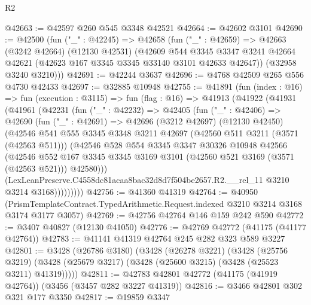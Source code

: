 \begin{lexlean}{R2}
\begin{coremodule}
@42663 := @42597 @260 @545 @3348 @42521
@42664 := @42602 @3101
@42690 := @42500
    (fun ("_" : @42245) =>
    @42658
      (fun ("_" : @42659) =>
      @42663
        (@3242 @42664)
        (@12130 @42531)
        (@42609
          @544
          @3345
          @3347
          @3241
          @42664
          @42621
          (@42623 @167 @3345 @3345 @33140 @3101 @42633 @42647))
        (@32958 @3240 @3210)))
@42691 := @42244 @3637
@42696 := @4768 @42509 @265 @556 @4730 @42433
@42697 := @32885 @10948
@42755 := @41891
    (fun (index : @16) =>
    fun (execution : @3115) =>
    fun (flag : @16) =>
    @41913
      (@41922
        (@41931
          (@41961
            (@42231
              (fun ("_" : @42232) =>
              @42405
                (fun ("_" : @42406) =>
                @42690
                  (fun ("_" : @42691) =>
                  @42696
                    (@3212 @42697)
                    (@12130 @42450)
                    (@42546
                      @541
                      @555
                      @3345
                      @3348
                      @3211
                      @42697
                      (@42560 @511 @3211 (@3571 (@42563 @511)))
                      (@42546
                        @528
                        @554
                        @3345
                        @3347
                        @30326
                        @10948
                        @42566
                        (@42546
                          @552
                          @167
                          @3345
                          @3345
                          @3169
                          @3101
                          (@42560 @521 @3169 (@3571 (@42563 @521)))
                          @42580)))
                    (LexLeanPreserve.C4558dc81acaa8bac32d8d7f504be2657.R2.__rel_11
                      @3210
                      @3214
                      @3168)))))))))
@42756 := @41360 @41319
@42764 := @40950
    (PrismTemplateContract.TypedArithmetic.Request.indexed @3210 @3214 @3168 @3174 @3177 @3057)
@42769 := @42756 @42764 @146 @159 @242 @590
@42772 := @3407 @40827 (@12130 @41050)
@42776 := @42769 @42772 (@41175 (@41177 @42764))
@42783 := @41141 @41319 @42764 @245 @282 @323 @589 @3227
@42801 := @3428
    (@26786 @3180)
    (@3428
      (@26278 @3221)
      (@3428
        (@25756 @3219)
        (@3428 (@25679 @3217) (@3428 (@25600 @3215) (@3428 (@25523 @3211) @41319)))))
@42811 := @42783 @42801 @42772 (@41175 (@41919 @42764)) (@3456 (@3457 @282 @3227 @41319))
@42816 := @3466 @42801 @302 @321 @177 @3350
@42817 := @19859 @3347

\end{coremodule}
\end{lexlean}
